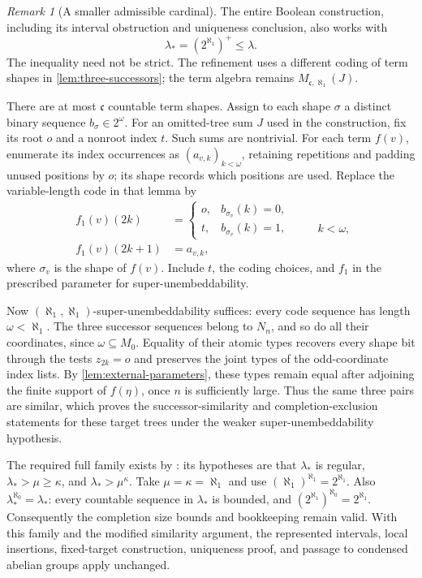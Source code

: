 \documentclass[11pt]{article}
\theoremstyle{definition}
\theoremstyle{remark}
\newtheorem{remark}[theorem]{Remark}
\newcommand{\cc}{\mathfrak c}
\begin{document}
\begin{remark}[A smaller admissible cardinal]\label{rem:smaller-cardinal}
The entire Boolean construction, including its interval obstruction and
uniqueness conclusion, also works with
\[
 \lambda_*=(2^{\aleph_1})^+\leq\lambda.
\]
The inequality need not be strict.  The refinement uses a different coding
of term shapes in \cref{lem:three-successors}; the term algebra remains
$M_{\cc,\aleph_1}(J)$.

There are at most $\cc$ countable term shapes.  Assign to each shape
$\sigma$ a distinct binary sequence $b_\sigma\in2^\omega$.  For an
omitted-tree sum $J$ used in the construction, fix its root $o$ and a
nonroot index $t$. Such sums are nontrivial. For each term $f(v)$, enumerate its
index occurrences as $(a_{v,k})_{k<\omega}$, retaining repetitions and
padding unused positions by $o$; its shape records which positions are
used.  Replace the variable-length code in that lemma by
\[
 \begin{split}
 f_1(v)(2k)&=
 \begin{cases}
 o,&b_{\sigma_v}(k)=0,\\
 t,&b_{\sigma_v}(k)=1,
 \end{cases}\\
 f_1(v)(2k+1)&=a_{v,k},
 \end{split}
 \qquad k<\omega,
\]
where $\sigma_v$ is the shape of $f(v)$.  Include $t$, the coding choices,
and $f_1$ in the prescribed parameter for super-unembeddability.

Now $(\aleph_1,\aleph_1)$-super-unembeddability suffices: every code
sequence has length $\omega<\aleph_1$.  The three successor sequences
belong to $N_n$, and so do all their coordinates, since
$\omega\subseteq M_0$.  Equality of their atomic types recovers every
shape bit through the tests $z_{2k}=o$ and preserves the joint types of
the odd-coordinate index lists.  By \cref{lem:external-parameters}, these
types remain equal after adjoining the finite support of $f(\eta)$,
once $n$ is sufficiently large.  Thus the same three pairs are similar,
which proves the successor-similarity and completion-exclusion statements
for these target trees under the weaker super-unembeddability hypothesis.

The required full family exists by \cite[Lemma~1.11(1)]{Shelah2023}:
its hypotheses are that $\lambda_*$ is regular,
$\lambda_*>\mu\geq\kappa$, and $\lambda_*>\mu^\kappa$.
Take $\mu=\kappa=\aleph_1$ and use
$(\aleph_1)^{\aleph_1}=2^{\aleph_1}$.
Also $\lambda_*^{\aleph_0}=\lambda_*$: every countable sequence in
$\lambda_*$ is bounded, and
$(2^{\aleph_1})^{\aleph_0}=2^{\aleph_1}$.
Consequently the completion size bounds and bookkeeping remain valid.
With this family and the modified similarity argument, the represented
intervals, local insertions, fixed-target construction, uniqueness proof,
and passage to condensed abelian groups apply unchanged.
\end{remark}
\end{document}
